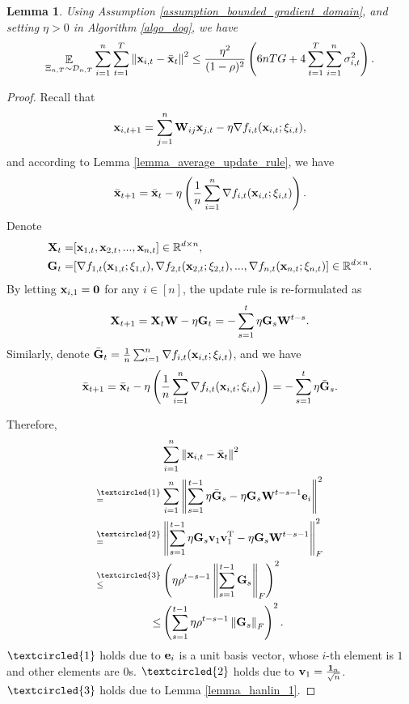 \documentclass{article}
\newtheorem{Lemma}{\bf{Lemma}}
\begin{document}
\begin{Lemma}
\label{lemma_x_variance_norm_square}
Using Assumption \ref{assumption_bounded_gradient_domain}, and setting $\eta>0$ in Algorithm \ref{algo_dog}, we have 
\begin{align}
\nonumber
\mathop{\mathbb{E}}_{ \Xi_{n,T} \sim \mathcal{D}_{n,T} } \sum_{i=1}^n\sum_{t=1}^T \left\lVert{\bf x}_{i,t} - \bar{{\bf x}}_t\right\rVert^2 \le \frac{\eta^2}{(1-\rho)^2}   \left(  6nTG + 4\sum_{t=1}^T\sum_{i=1}^n \sigma_{i,t}^2  \right).
\end{align}

\end{Lemma}
\begin{proof}


Recall that 
\begin{align}
\nonumber
{\bf x}_{i,t+1} = \sum_{j=1}^n {\bf W}_{ij}{\bf x}_{j,t} - \eta \nabla f_{i,t}({\bf x}_{i,t};\xi_{i,t}), 
\end{align} and according to Lemma \ref{lemma_average_update_rule}, we have 
\begin{align}
\nonumber
\bar{{\bf x}}_{t+1} = \bar{{\bf x}}_t - \eta \left( \frac{1}{n}\sum_{i=1}^n \nabla f_{i,t}({\bf x}_{i,t};\xi_{i,t}) \right).
\end{align} Denote 
\begin{align}
\nonumber
{\bf X}_t = &  [{\bf x}_{1,t}, {\bf x}_{2,t}, ..., {\bf x}_{n,t}] \in \mathbb{R}^{d\times n}, \\ \nonumber
{\bf G}_t = & [\nabla f_{1,t}({\bf x}_{1,t};\xi_{1,t}), \nabla f_{2,t}({\bf x}_{2,t};\xi_{2,t}), ..., \nabla f_{n,t}({\bf x}_{n,t};\xi_{n,t})] \in \mathbb{R}^{d\times n}.
\end{align} By letting ${\bf x}_{i,1} = {\bf 0}$ for any $i\in[n]$, the update rule is re-formulated as 
\begin{align}
\nonumber
{\bf X}_{t+1} = {\bf X}_t {\bf W} - \eta {\bf G}_t = - \sum_{s=1}^t \eta {\bf G}_s {\bf W}^{t-s}. 
\end{align} Similarly, denote $\bar{{\bf G}}_t = \frac{1}{n}\sum_{i=1}^n \nabla f_{i,t}({\bf x}_{i,t};\xi_{i,t})$, and we have
\begin{align}
\bar{{\bf x}}_{t+1} = \bar{{\bf x}}_t - \eta \left( \frac{1}{n}\sum_{i=1}^n \nabla f_{i,t}({\bf x}_{i,t};\xi_{i,t}) \right) = - \sum_{s=1}^t \eta \bar{{\bf G}}_s. 
\end{align}


Therefore, 
\begin{align}
\nonumber
& \sum_{i=1}^n \lrnorm{\x_{i,t} - \bar{\x}_t}^2 \\ \nonumber
\refabovecir{=}{\textcircled{1}} & \sum_{i=1}^n \lrnorm{ \sum_{s=1}^{t-1} \eta \bar{\G}_s - \eta \G_s \W^{t-s-1}\e_i }^2   \\ \nonumber
\refabovecir{=}{\textcircled{2}} & \lrnorm{ \sum_{s=1}^{t-1} \eta \G_s\v_1 \v_1\Tr - \eta \G_s \W^{t-s-1} }^2_F   \\ \nonumber
\refabovecir{\le}{\textcircled{3}} & \lrincir{ \eta \rho^{t-s-1} \lrnorm{\sum_{s=1}^{t-1}\G_s}_F}^2 \\ \nonumber
\le & \lrincir{ \sum_{s=1}^{t-1} \eta \rho^{t-s-1} \lrnorm{\G_s}_F}^2.
\end{align} $\textcircled{1}$ holds due to ${\bf e}_i$ is a unit basis vector, whose $i$-th element is $1$ and other elements are $0$s. $\textcircled{2}$ holds due to ${\bf v}_1 = \frac{{\bf 1}_n}{\sqrt{n}}$. $\textcircled{3}$ holds due to Lemma \ref{lemma_hanlin_1}. 



\end{proof}
\end{document}
